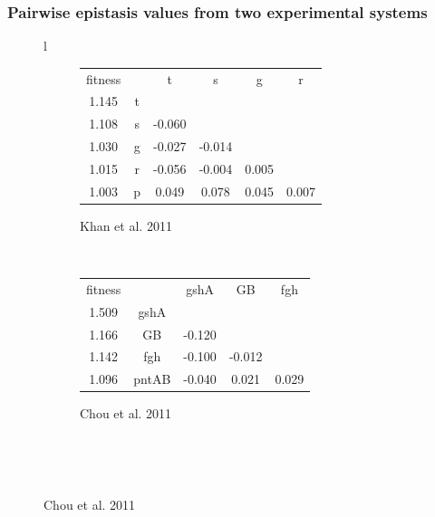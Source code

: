 \documentclass[compress]{beamer}
\begin{document}

\begin{frame}
\frametitle{Pairwise epistasis values from two experimental systems}

\begin{figure}
\newcommand{\hlB}{\cellcolor{blue!20}}
\newcommand{\hlR}{\cellcolor{red!20}}
\hspace{1.35cm}
\begin{tabular}{l}
\begin{subfigure}[l]{0.5\textwidth}
\caption{Khan et al. 2011}
\begin{tabular}{cccccc}
fitness &   & t           & s           & g           & r           \\
1.145   & t &             &             &             &             \\
1.108   & s & \hlB -0.060 &             &             &             \\
1.030   & g & \hlB -0.027 & \hlB -0.014 &             &             \\
1.015   & r & \hlB -0.056 & \hlB -0.004 & \hlR 0.005  &             \\
1.003   & p & \hlR  0.049 & \hlR  0.078 & \hlR 0.045  & \hlR 0.007  \\
\end{tabular}
\end{subfigure}
\\
\begin{subfigure}[l]{0.5\textwidth}
\caption{Chou et al. 2011}
\begin{tabular}{ccccc}
fitness &       & gshA        & GB          & fgh         \\
1.509   & gshA  &             &             &             \\
1.166   & GB    & \hlB -0.120 &             &             \\
1.142   & fgh   & \hlB -0.100 & \hlB -0.012 &             \\
1.096   & pntAB & \hlB -0.040 & \hlR  0.021 & \hlR 0.029  \\
\end{tabular}
\end{subfigure}
\\
\end{tabular}
\hfill\
\end{figure}
\end{frame}

\end{document}

